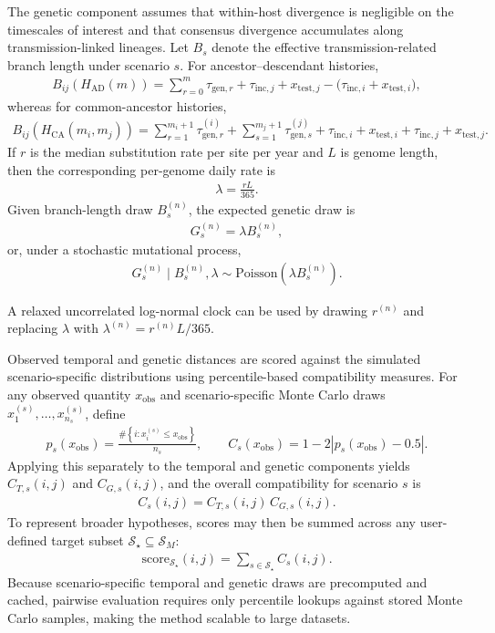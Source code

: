 \documentclass[10pt,a4paper]{article}
\begin{document}
The genetic component assumes that within-host divergence is negligible on the timescales of interest and that consensus divergence accumulates along transmission-linked lineages. Let $B_s$ denote the effective transmission-related branch length under scenario $s$. For ancestor--descendant histories,
\begin{align}
B_{ij}\!\left(H_{\mathrm{AD}}(m)\right)
=
\sum_{r=0}^{m}\tau_{\mathrm{gen},r}
+
\tau_{\mathrm{inc},j} + x_{\mathrm{test},j}
-
\bigl(\tau_{\mathrm{inc},i} + x_{\mathrm{test},i}\bigr),
\end{align}
whereas for common-ancestor histories,
\begin{align}
B_{ij}\!\left(H_{\mathrm{CA}}(m_i,m_j)\right)
=
\sum_{r=1}^{m_i+1}\tau_{\mathrm{gen},r}^{(i)}
+
\sum_{s=1}^{m_j+1}\tau_{\mathrm{gen},s}^{(j)}
+
\tau_{\mathrm{inc},i} + x_{\mathrm{test},i}
+
\tau_{\mathrm{inc},j} + x_{\mathrm{test},j}.
\end{align}
If $r$ is the median substitution rate per site per year and $L$ is genome length, then the corresponding per-genome daily rate is
\begin{align}
\lambda = \frac{rL}{365}.
\end{align}
Given branch-length draw $B_s^{(n)}$, the expected genetic draw is
\begin{align}
G_s^{(n)} = \lambda B_s^{(n)},
\end{align}
or, under a stochastic mutational process,
\begin{align}
G_s^{(n)} \mid B_s^{(n)},\lambda
\sim
\mathrm{Poisson}\!\left(\lambda B_s^{(n)}\right).
\end{align}

A relaxed uncorrelated log-normal clock can be used by drawing $r^{(n)}$ and replacing $\lambda$ with $\lambda^{(n)} = r^{(n)}L/365$.

Observed temporal and genetic distances are scored against the simulated scenario-specific distributions using percentile-based compatibility measures. For any observed quantity $x_{\mathrm{obs}}$ and scenario-specific Monte Carlo draws $x_1^{(s)},\ldots,x_{n_s}^{(s)}$, define
\begin{align}
p_s(x_{\mathrm{obs}})
=
\frac{\#\left\{i:x_i^{(s)} \le x_{\mathrm{obs}}\right\}}{n_s},
\qquad
C_s(x_{\mathrm{obs}})
=
1 - 2\left|p_s(x_{\mathrm{obs}}) - 0.5\right|.
\end{align}
Applying this separately to the temporal and genetic components yields $C_{T,s}(i,j)$ and $C_{G,s}(i,j)$, and the overall compatibility for scenario $s$ is
\begin{align}
C_s(i,j) = C_{T,s}(i,j)\,C_{G,s}(i,j).
\end{align}
To represent broader hypotheses, scores may then be summed across any user-defined target subset $\mathcal{S}_\star \subseteq \mathcal{S}_M$:
\begin{align}
\mathrm{score}_{\mathcal{S}_\star}(i,j)
=
\sum_{s \in \mathcal{S}_\star} C_s(i,j).
\end{align}
Because scenario-specific temporal and genetic draws are precomputed and cached, pairwise evaluation requires only percentile lookups against stored Monte Carlo samples, making the method scalable to large datasets.



\end{document}
